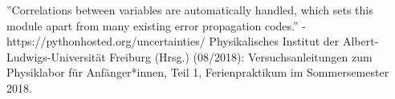 \documentclass[11pt,a4paper]{article}
\begin{document}

\begin{thebibliography}{9}
''Correlations between variables are automatically handled, which sets this module apart from many existing error propagation codes.'' - https://pythonhosted.org/uncertainties/
 Physikalisches Institut der Albert-Ludwigs-Universität Freiburg (Hrsg.) (08/2018): Versuchsanleitungen zum Physiklabor für Anfänger*innen, Teil 1, Ferienpraktikum im Sommersemester 2018.
\end{thebibliography}
\end{document}
